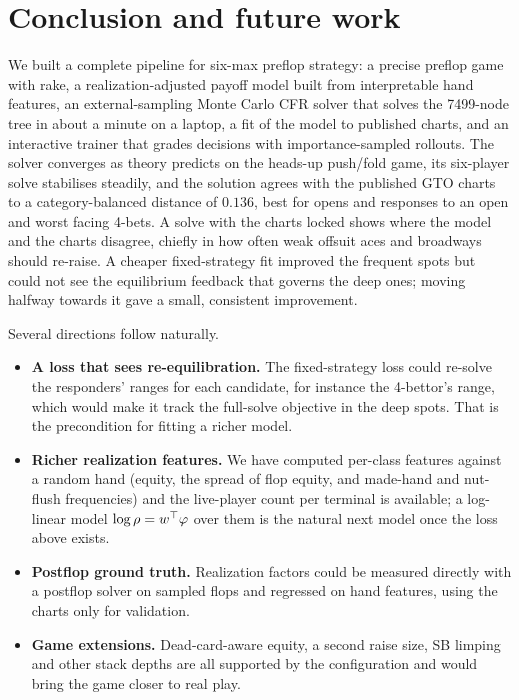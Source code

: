 \section{Conclusion and future work}\label{sec:conclusion}

We built a complete pipeline for six-max preflop strategy: a precise preflop game with rake, a realization-adjusted payoff model built from interpretable hand features, an external-sampling Monte Carlo CFR solver that solves the \num{7499}-node tree in about a minute on a laptop, a fit of the model to published charts, and an interactive trainer that grades decisions with importance-sampled rollouts. The solver converges as theory predicts on the heads-up push/fold game, its six-player solve stabilises steadily, and the solution agrees with the published GTO charts to a category-balanced distance of $0.136$, best for opens and responses to an open and worst facing 4-bets. A solve with the charts locked shows where the model and the charts disagree, chiefly in how often weak offsuit aces and broadways should re-raise. A cheaper fixed-strategy fit improved the frequent spots but could not see the equilibrium feedback that governs the deep ones; moving halfway towards it gave a small, consistent improvement.

Several directions follow naturally.
\begin{itemize}
  \item \textbf{A loss that sees re-equilibration.} The fixed-strategy loss could re-solve the responders' ranges for each candidate, for instance the 4-bettor's range, which would make it track the full-solve objective in the deep spots. That is the precondition for fitting a richer model.
  \item \textbf{Richer realization features.} We have computed per-class features against a random hand (equity, the spread of flop equity, and made-hand and nut-flush frequencies) and the live-player count per terminal is available; a log-linear model $\log\rho = w^\top\varphi$ over them is the natural next model once the loss above exists.
  \item \textbf{Postflop ground truth.} Realization factors could be measured directly with a postflop solver on sampled flops and regressed on hand features, using the charts only for validation.
  \item \textbf{Game extensions.} Dead-card-aware equity, a second raise size, SB limping and other stack depths are all supported by the configuration and would bring the game closer to real play.
\end{itemize}
